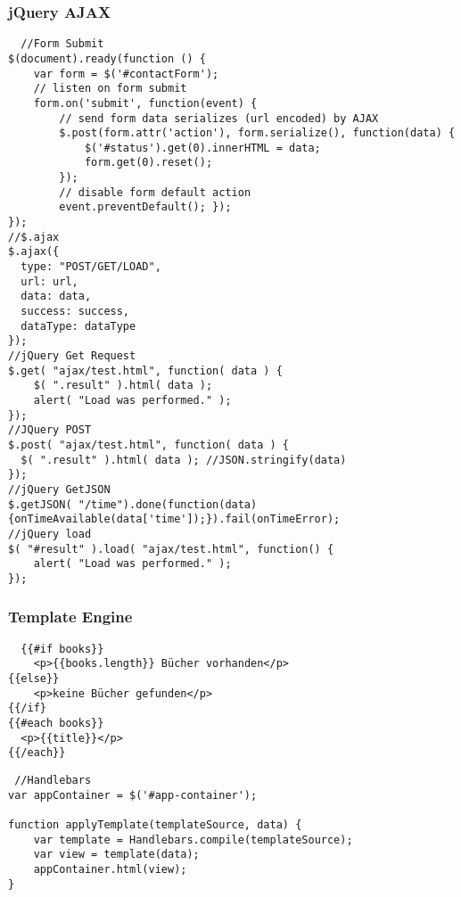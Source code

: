\begin{multicols*}{4}
 \subsubsection{jQuery AJAX}
 
\begin{verbatim}
  //Form Submit
$(document).ready(function () {
    var form = $('#contactForm');
    // listen on form submit
    form.on('submit', function(event) {
        // send form data serializes (url encoded) by AJAX
        $.post(form.attr('action'), form.serialize(), function(data) {
            $('#status').get(0).innerHTML = data;
            form.get(0).reset();
        });
        // disable form default action
        event.preventDefault(); });
});
//$.ajax
$.ajax({
  type: "POST/GET/LOAD",
  url: url,
  data: data,
  success: success,
  dataType: dataType
});
//jQuery Get Request
$.get( "ajax/test.html", function( data ) {
    $( ".result" ).html( data );
    alert( "Load was performed." );
});
//JQuery POST
$.post( "ajax/test.html", function( data ) {
  $( ".result" ).html( data ); //JSON.stringify(data)
});
//jQuery GetJSON
$.getJSON( "/time").done(function(data)
{onTimeAvailable(data['time']);}).fail(onTimeError);
//jQuery load
$( "#result" ).load( "ajax/test.html", function() {
    alert( "Load was performed." );
});
\end{verbatim}


\subsubsection{Template Engine}
\begin{verbatim}
  {{#if books}}
	<p>{{books.length}} Bücher vorhanden</p>
{{else}}
	<p>keine Bücher gefunden</p>
{{/if}
{{#each books}}
  <p>{{title}}</p>
{{/each}}
\end{verbatim}

\begin{verbatim}
 //Handlebars
var appContainer = $('#app-container');

function applyTemplate(templateSource, data) {
	var template = Handlebars.compile(templateSource);
	var view = template(data);
	appContainer.html(view);
}


\end{verbatim}
\end{multicols*}
